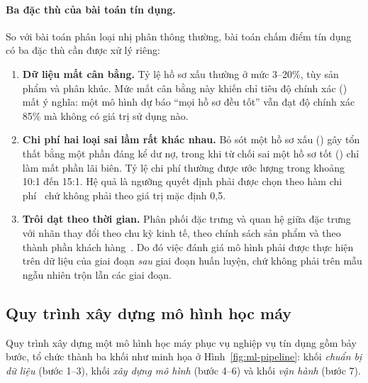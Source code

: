 \paragraph{Ba đặc thù của bài toán tín dụng.} So với bài toán phân loại nhị phân
thông thường, bài toán chấm điểm tín dụng có ba đặc thù cần được xử lý riêng:

\begin{enumerate}[label=(\arabic*)]
  \item \textbf{Dữ liệu mất cân bằng.} Tỷ lệ hồ sơ xấu thường ở mức 3--20\%, tùy
  sản phẩm và phân khúc. Mức mất cân bằng này khiến chỉ tiêu độ chính xác
  () mất ý nghĩa: một mô hình dự báo ``mọi hồ sơ đều tốt'' vẫn đạt
  độ chính xác 85\% mà không có giá trị sử dụng nào.

  \item \textbf{Chi phí hai loại sai lầm rất khác nhau.} Bỏ sót một hồ sơ xấu
  () gây tổn thất bằng một phần đáng kể dư nợ, trong khi từ
  chối sai một hồ sơ tốt () chỉ làm mất phần lãi biên. Tỷ lệ
  chi phí thường được ước lượng trong khoảng 10:1 đến 15:1. Hệ quả là ngưỡng
  quyết định phải được chọn theo hàm chi phí~\cite{elkan2001} chứ không phải theo
  giá trị mặc định 0,5.

  \item \textbf{Trôi dạt theo thời gian.} Phân phối đặc trưng và quan hệ giữa đặc
  trưng với nhãn thay đổi theo chu kỳ kinh tế, theo chính sách sản phẩm và theo
  thành phần khách hàng~\cite{gama2014}. Do đó việc đánh giá mô hình phải được
  thực hiện trên dữ liệu của giai đoạn \textit{sau} giai đoạn huấn luyện, chứ
  không phải trên mẫu ngẫu nhiên trộn lẫn các giai đoạn.
\end{enumerate}

\subsection{Quy trình xây dựng mô hình học máy}
\label{subsec:quy-trinh-xay-dung-mo-hinh}

Quy trình xây dựng một mô hình học máy phục vụ nghiệp vụ tín dụng gồm bảy bước,
tổ chức thành ba khối như minh họa ở Hình~\ref{fig:ml-pipeline}: khối
\textit{chuẩn bị dữ liệu} (bước 1--3), khối \textit{xây dựng mô hình} (bước 4--6)
và khối \textit{vận hành} (bước 7).

